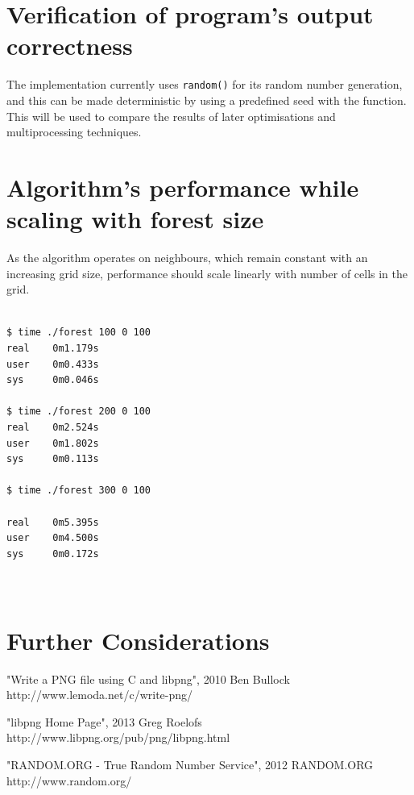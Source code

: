 \documentclass[11pt,a4paper]{article}
\begin{document}
\newpage
\section{Verification of program's output correctness}

The implementation currently uses \texttt{random()} for its random number
generation, and this can be made deterministic by using a predefined seed with
the  function. This will be used to compare the results of
later optimisations and multiprocessing techniques.

\newpage
\section{Algorithm's performance while scaling with forest size}

As the algorithm operates on neighbours, which remain constant with an
increasing grid size, performance should scale linearly with number of cells in
the grid.

\begin{verbatim}

$ time ./forest 100 0 100
real    0m1.179s
user    0m0.433s
sys     0m0.046s

$ time ./forest 200 0 100
real    0m2.524s
user    0m1.802s
sys     0m0.113s

$ time ./forest 300 0 100

real    0m5.395s
user    0m4.500s
sys     0m0.172s



\end{verbatim}

\newpage
\section{Further Considerations}

\newpage

\begin{thebibliography}{99}

"Write a PNG file using C and libpng", 2010 Ben Bullock
http://www.lemoda.net/c/write-png/

"libpng Home Page", 2013 Greg Roelofs
http://www.libpng.org/pub/png/libpng.html

"RANDOM.ORG - True Random Number Service", 2012 RANDOM.ORG
http://www.random.org/

\end{thebibliography}
\end{document}
